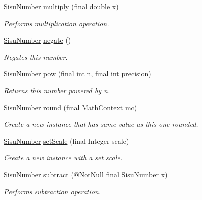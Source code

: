 \begin{DoxyCompactItemize}
\hyperlink{classcom_1_1aarrelaakso_1_1drawl_1_1_sisu_number}{Sisu\+Number} \hyperlink{classcom_1_1aarrelaakso_1_1drawl_1_1_sisu_number_ac95dad537574d5b991f658181e27a0e3}{multiply} (final double x)
\begin{DoxyCompactList}\small\item\em Performs multiplication operation. \end{DoxyCompactList}\item 
\hyperlink{classcom_1_1aarrelaakso_1_1drawl_1_1_sisu_number}{Sisu\+Number} \hyperlink{classcom_1_1aarrelaakso_1_1drawl_1_1_sisu_number_a2386c00d733c84ee7c97ae11d7d05ea8}{negate} ()
\begin{DoxyCompactList}\small\item\em Negates this number. \end{DoxyCompactList}\item 
\hyperlink{classcom_1_1aarrelaakso_1_1drawl_1_1_sisu_number}{Sisu\+Number} \hyperlink{classcom_1_1aarrelaakso_1_1drawl_1_1_sisu_number_a72dee08eae0e9522da081b0c67481b44}{pow} (final int n, final int precision)
\begin{DoxyCompactList}\small\item\em Returns this number powered by n. \end{DoxyCompactList}\item 
\hyperlink{classcom_1_1aarrelaakso_1_1drawl_1_1_sisu_number}{Sisu\+Number} \hyperlink{classcom_1_1aarrelaakso_1_1drawl_1_1_sisu_number_ad3965ead995f42b7f2c52421f69bba7e}{round} (final Math\+Context mc)
\begin{DoxyCompactList}\small\item\em Create a new instance that has same value as this one rounded. \end{DoxyCompactList}\item 
\hyperlink{classcom_1_1aarrelaakso_1_1drawl_1_1_sisu_number}{Sisu\+Number} \hyperlink{classcom_1_1aarrelaakso_1_1drawl_1_1_sisu_number_a3c4d186b36b3eb9efac741e435f94024}{set\+Scale} (final Integer scale)
\begin{DoxyCompactList}\small\item\em Create a new instance with a set scale. \end{DoxyCompactList}\item 
\hyperlink{classcom_1_1aarrelaakso_1_1drawl_1_1_sisu_number}{Sisu\+Number} \hyperlink{classcom_1_1aarrelaakso_1_1drawl_1_1_sisu_number_a09a313ba215327b1e59528090e2632a1}{subtract} (@Not\+Null final \hyperlink{classcom_1_1aarrelaakso_1_1drawl_1_1_sisu_number}{Sisu\+Number} x)
\begin{DoxyCompactList}\small\item\em Performs subtraction operation. \end{DoxyCompactList}\item 

\end{DoxyCompactItemize}
